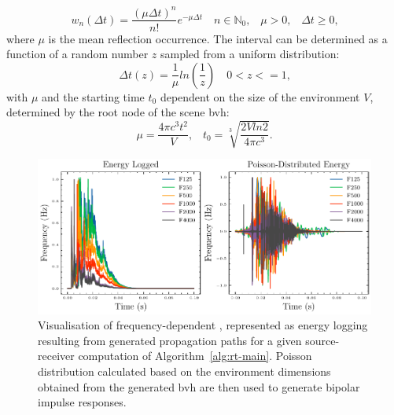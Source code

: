 \begin{equation}
\label{eq:poisson-distributed-diracs}
    w_n(\Delta t) = \frac{(\mu \Delta t)^n}{n!} e^{-\mu \Delta t} \quad n \in \mathbb{N}_0\textrm{,} \quad \mu > 0\textrm{,} \quad \Delta t \ge 0\textrm{,}
\end{equation}
where $\mu$ is the mean reflection occurrence. The interval can be determined as a function of a random number $z$ sampled from a uniform distribution: 
\begin{equation}
    \Delta t(z) = \frac{1}{\mu}ln(\frac{1}{z}) \quad 0 < z <= 1\textrm{,}
\end{equation}
with $\mu$ and the starting time $t_0$ dependent on the size of the environment $V$, determined by the root node of the scene \acrshort{bvh}: 
\begin{equation}
    \mu = \frac{4\pi c^3 t^2}{V}\textrm{,} \quad t_0 = \sqrt[3]{\frac{2Vln2}{4\pi c^3}}\textrm{.}
\end{equation}

\begin{figure}[htbp]
    \centering
    \includegraphics[width=1\linewidth]{rir-processing}
    \caption{Visualisation of frequency-dependent , represented as energy logging resulting from generated propagation paths for a given source-receiver computation of Algorithm~\ref{alg:rt-main}. Poisson distribution calculated based on the environment dimensions obtained from the generated \acrshort{bvh} are then used to generate bipolar impulse responses.}
    \label{fig:rir-freqdep-poisson}
\end{figure}

